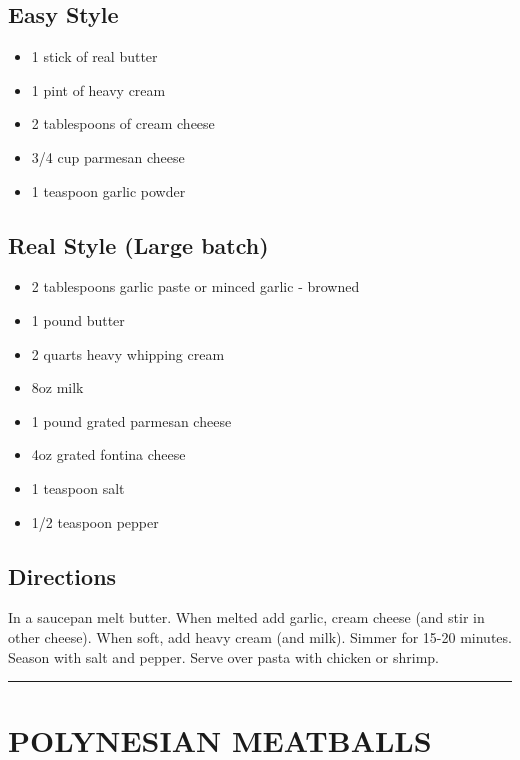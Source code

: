 \documentclass[
]{book}
\providecommand{\tightlist}{%
  \setlength{\itemsep}{0pt}\setlength{\parskip}{0pt}}
\begin{document}
\hypertarget{easy-style}{%
\subsection*{Easy Style}\label{easy-style}}


\begin{itemize}
\tightlist
\item
  1 stick of real butter
\item
  1 pint of heavy cream
\item
  2 tablespoons of cream cheese
\item
  3/4 cup parmesan cheese
\item
  1 teaspoon garlic powder
\end{itemize}

\hypertarget{real-style-large-batch}{%
\subsection{Real Style (Large batch)}\label{real-style-large-batch}}

\begin{itemize}
\tightlist
\item
  2 tablespoons garlic paste or minced garlic - browned
\item
  1 pound butter
\item
  2 quarts heavy whipping cream
\item
  8oz milk
\item
  1 pound grated parmesan cheese
\item
  4oz grated fontina cheese
\item
  1 teaspoon salt
\item
  1/2 teaspoon pepper
\end{itemize}

\hypertarget{directions-62}{%
\subsection*{Directions}\label{directions-62}}


In a saucepan melt butter. When melted add garlic, cream cheese (and stir in other cheese).
When soft, add heavy cream (and milk). Simmer for 15-20 minutes. Season with salt and pepper.
Serve over pasta with chicken or shrimp.

\begin{center}\rule{0.5\linewidth}{0.5pt}\end{center}

\hypertarget{polynesian-meatballs}{%
\section*{POLYNESIAN MEATBALLS}\label{polynesian-meatballs}}
\end{document}
